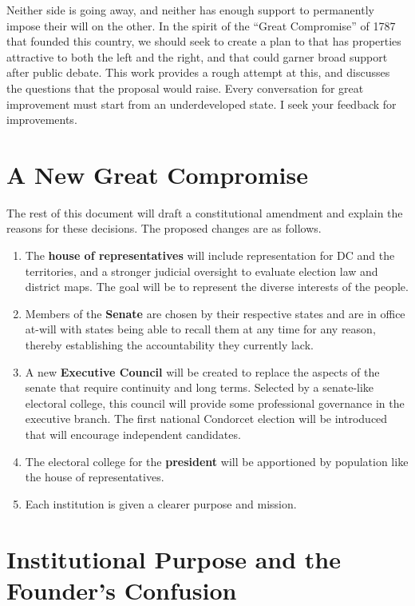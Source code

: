 \documentclass{article}
\begin{document}
Neither side is going away, and neither has enough support to permanently impose their will on the other. In the spirit of the “Great Compromise” of 1787 that founded this country, we should seek to create a plan to that has properties attractive to both the left and the right, and that could garner broad support after public debate. This work provides a rough attempt at this, and discusses the questions that the proposal would raise. Every conversation for great improvement must start from an underdeveloped state. I seek your feedback for improvements.

\section{A New Great Compromise}

The rest of this document will draft a constitutional amendment and explain the reasons for these decisions. The proposed changes are as follows.
\begin{enumerate}
  \item The \textbf{house of representatives} will include representation for DC and the territories, and a stronger judicial oversight to evaluate election law and district maps. The goal will be to represent the diverse interests of the people.
  \item Members of the \textbf{Senate} are chosen by their respective states and are in office at-will with states being able to recall them at any time for any reason, thereby establishing the accountability they currently lack.
  \item A new \textbf{Executive Council} will be created to replace the aspects of the senate that require continuity and long terms. Selected by a senate-like electoral college, this council will provide some professional governance in the executive branch. The first national Condorcet election will be introduced that will encourage independent candidates.
  \item The electoral college for the \textbf{president} will be apportioned by population like the house of representatives.
 \item Each institution is given a clearer purpose and mission.
\end{enumerate}

\section{Institutional Purpose and the Founder’s Confusion}
\end{document}
